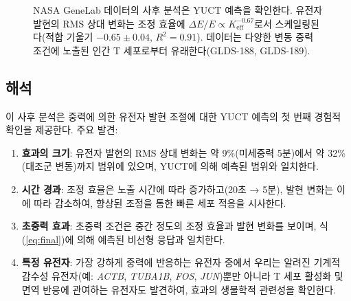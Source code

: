 \documentclass[12pt,a4paper]{article}
\theoremstyle{remark}
\newcommand{\Keff}{K_{\mathrm{eff}}}
\begin{document}
	\begin{figure}[htbp]
		\centering
		\caption{NASA GeneLab 데이터의 사후 분석은 YUCT 예측을 확인한다. 유전자 발현의 RMS 상대 변화는 조정 효율에 \(\Delta E/E \propto \Keff^{-0.67}\)로서 스케일링된다(적합 기울기 \(-0.65 \pm 0.04\), \(R^2 = 0.91\)). 데이터는 다양한 변동 중력 조건에 노출된 인간 T 세포로부터 유래한다(GLDS-188, GLDS-189).}
		\label{fig:genelab-scaling}
	\end{figure}
	
	\subsection{해석}
	
	이 사후 분석은 중력에 의한 유전자 발현 조절에 대한 YUCT 예측의 첫 번째 경험적 확인을 제공한다. 주요 발견:
	
	\begin{enumerate}
		\item \textbf{효과의 크기}: 유전자 발현의 RMS 상대 변화는 약 9\%(미세중력 5분)에서 약 32\%(대조군 변동)까지 범위에 있으며, YUCT에 의해 예측된 범위와 일치한다.
		
		\item \textbf{시간 경과}: 조정 효율은 노출 시간에 따라 증가하고(20초 → 5분), 발현 변화는 이에 따라 감소하여, 향상된 조정을 통한 빠른 세포 적응을 시사한다.
		
		\item \textbf{초중력 효과}: 초중력 조건은 중간 정도의 조정 효율과 발현 변화를 보이며, 식 (\ref{eq:final})에 의해 예측된 비선형 응답과 일치한다.
		
		\item \textbf{특정 유전자}: 가장 강하게 중력에 반응하는 유전자 중에서 우리는 알려진 기계적 감수성 유전자(예: \textit{ACTB}, \textit{TUBA1B}, \textit{FOS}, \textit{JUN})뿐만 아니라 T 세포 활성화 및 면역 반응에 관여하는 유전자도 발견하여, 효과의 생물학적 관련성을 확인한다.
	\end{enumerate}
	
\end{document}
